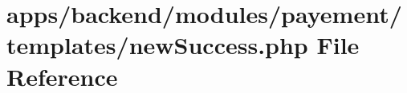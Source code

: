 \hypertarget{backend_2modules_2payement_2templates_2new_success_8php}{\section{apps/backend/modules/payement/templates/new\-Success.php File Reference}
\label{backend_2modules_2payement_2templates_2new_success_8php}
}
